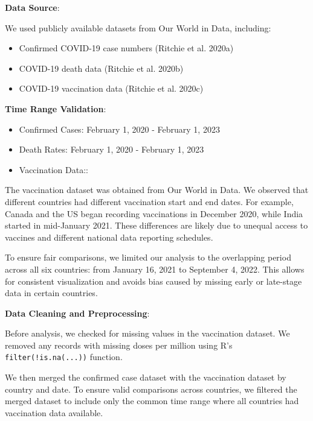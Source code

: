 \documentclass[
  11pt,
]{article}
\begin{document}
\textbf{Data Source}:

We used publicly available datasets from Our World in Data, including:

\begin{itemize}
\item
  Confirmed COVID-19 case numbers (Ritchie et al. 2020a)
\item
  COVID-19 death data (Ritchie et al. 2020b)
\item
  COVID-19 vaccination data (Ritchie et al. 2020c)
\end{itemize}

\textbf{Time Range Validation}:

\begin{itemize}
\item
  Confirmed Cases: February 1, 2020 - February 1, 2023
\item
  Death Rates: February 1, 2020 - February 1, 2023
\item
  Vaccination Data::
\end{itemize}

The vaccination dataset was obtained from Our World in Data. We observed
that different countries had different vaccination start and end dates.
For example, Canada and the US began recording vaccinations in December
2020, while India started in mid-January 2021. These differences are
likely due to unequal access to vaccines and different national data
reporting schedules.

To ensure fair comparisons, we limited our analysis to the overlapping
period across all six countries: from January 16, 2021 to September 4,
2022. This allows for consistent visualization and avoids bias caused by
missing early or late-stage data in certain countries.

\textbf{Data Cleaning and Preprocessing}:

Before analysis, we checked for missing values in the vaccination
dataset. We removed any records with missing doses per million using R's
\texttt{filter(!is.na(...))} function.

We then merged the confirmed case dataset with the vaccination dataset
by country and date. To ensure valid comparisons across countries, we
filtered the merged dataset to include only the common time range where
all countries had vaccination data available.
\end{document}
